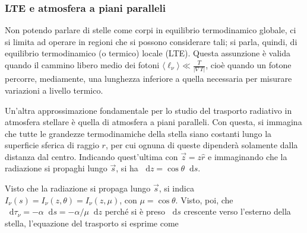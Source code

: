 \documentclass[11pt, a4paper]{scrartcl}
\theoremstyle{style}
\theoremstyle{style1}
\newcommand{\dd}{\mathop{}\!\mathrm{d}}
\numberwithin{equation}{subsection}
\begin{document}
\subsubsection{LTE e atmosfera a piani paralleli}
Non potendo parlare di stelle come corpi in equilibrio termodinamico globale, ci si limita ad operare in regioni che si possono considerare tali; si parla, quindi, di equilibrio termodinamico (o termico) locale (LTE).
Questa assunzione \`e valida quando il cammino libero medio dei fotoni $\langle \ell _\nu  \rangle \ll \frac{T}{\lvert \nabla T \rvert }$, cio\`e quando un fotone percorre, mediamente, una lunghezza inferiore a quella necessaria per misurare variazioni a livello termico.
\begin{center}
	\begin{minipage}
		{.45\columnwidth}
Un'altra approssimazione fondamentale per lo studio del trasporto radiativo in atmosfera stellare \`e quella di atmosfera a piani paralleli.
Con questa, si immagina che tutte le grandezze termodinamiche della stella siano costanti lungo la superficie sferica di raggio $r$, per cui ognuna di queste dipender\`a solamente dalla distanza dal centro.
Indicando quest'ultima con $\vec{z}=z \hat{r}$ e immaginando che la radiazione si propaghi lungo $\vec{s}$, si ha $\dd z = \cos \theta  \dd s$.
	\end{minipage}
	\hfill
	\begin{minipage}
		{.45\columnwidth}
	\centering
	\end{minipage}
\end{center}
\noindent Visto che la radiazione si propaga lungo $\vec{s}$, si indica $I_\nu (s)=I_\nu (z,\theta ) = I_\nu (z,\mu )$, con $\mu  = \cos \theta $.
Visto, poi, che $\dd \tau _\nu  = - \alpha \dd s=-\alpha / \mu  \dd z$ perch\'e si \`e preso $\dd s$ crescente verso l'esterno della stella, l'equazione del trasporto si esprime come
\end{document}
